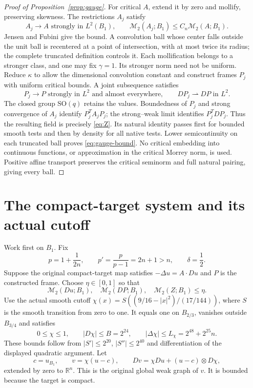 \documentclass[11pt,a4paper]{article}
\numberwithin{equation}{section}
\theoremstyle{definition}
\theoremstyle{remark}
\newcommand{\R}{\mathbb R}
\newcommand{\SO}{\mathrm{SO}}
\newcommand{\M}{\mathcal M}
\begin{document}
\begin{proof}[Proof of Proposition~\ref{prop:gauge}]
For critical $A$, extend it by zero and mollify, preserving skewness.
The restrictions $A_j$ satisfy
\[
 A_j\longrightarrow A\text{ strongly in }L^2(B_1),\qquad
 \M_2(A_j;B_1)\leq C_n\M_2(A;B_1).
\]
Jensen and Fubini give the bound. A convolution ball whose center falls
outside the unit ball is recentered at a point of intersection, with
at most twice its radius; the complete truncated definition controls
it. Each mollification belongs to a stronger class, and one may fix
$\gamma=1$. Its stronger norm need not be uniform. Reduce $\kappa$
to allow the dimensional convolution constant and construct frames
$P_j$ with uniform critical bounds. A joint subsequence satisfies
\[
 P_j\to P\text{ strongly in }L^2\text{ and almost everywhere},\qquad
 DP_j\rightharpoonup DP\text{ in }L^2.
\]
The closed group $\SO(q)$ retains the values. Boundedness of $P_j$
and strong convergence of $A_j$ identify $P_j^TA_jP_j$; the strong--weak
limit identifies $P_j^TDP_j$. Thus the resulting field is precisely
\eqref{eq:Z}. Its natural identity passes first for bounded smooth
tests and then by density for all native tests. Lower semicontinuity
on each truncated ball proves \eqref{eq:gauge-bound}.
No critical embedding into continuous functions, or approximation in
the critical Morrey norm, is used. Positive affine transport preserves
the critical seminorm and full natural pairing, giving every ball.
\end{proof}

\section{The compact-target system and its actual cutoff}\label{sec:system}
Work first on $B_1$. Fix
\begin{equation}\label{eq:p}
 p=1+\frac1{2n},\qquad p'=\frac p{p-1}=2n+1>n,\qquad\delta=\frac12.
\end{equation}
Suppose the original compact-target map satisfies
$-\Delta u=A\cdot Du$ and $P$ is the constructed frame. Choose
$\eta\in[0,1]$ so that
\begin{equation}\label{eq:eta}
 \M_2(Du;B_1),\quad\M_2(DP;B_1),\quad\M_2(Z;B_1)\leq\eta.
\end{equation}
Use the actual smooth cutoff
$\chi(x)=S((9/16-|x|^2)/(17/144))$, where $S$ is the smooth
transition from zero to one. It equals one on $B_{2/3}$, vanishes
outside $B_{3/4}$ and satisfies
\begin{equation}\label{eq:fixed-cutoff-numbers}
 0\leq\chi\leq1,\qquad |D\chi|\leq B=2^{24},\qquad
 |\Delta\chi|\leq L_\chi=2^{48}+2^{25}n.
\end{equation}
These bounds follow from $|S'|\leq2^{20}$, $|S''|\leq2^{40}$
and differentiation of the displayed quadratic argument. Let
\begin{equation}\label{eq:cutoff}
 c=u_{B_1},\qquad v=\chi(u-c),\qquad
 Dv=\chi Du+(u-c)\otimes D\chi,
\end{equation}
extended by zero to $\R^n$. This is the original global weak graph of
$v$. It is bounded because the target is compact.
\end{document}
